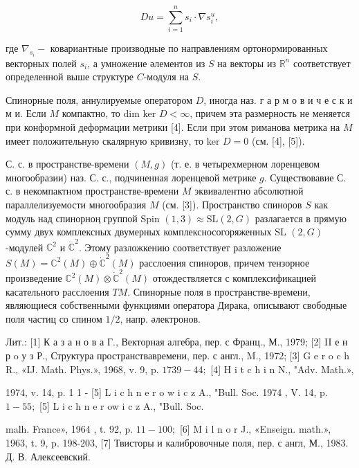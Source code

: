 \documentclass[10pt]{article}
\begin{document}
\[

D u=\sum_{i=1}^{n} s_{i} \cdot \nabla s_{i}^{u},

\]



где $\nabla_{s_{i}}-$ ковариантные производные по направлениям ортонормированных векторных полей $s_{i}$, а умножение әлементов из $S$ на векторы из $\mathbb{R}^{n}$ соответствует определенной выше структуре $C$-модуля на $S$.



Спинорные поля, аннулируемые оператором $D$, иногда наз. г а р м о в и ч е с к и м и. Если $M$ компактно, то dim ker $D<\infty$, причем эта размерность не меняется при конформной деформации метрики [4]. Если при этом риманова метрика на $M$ имеет положительную скалярную кривизну, то ker $D=0$ (см. [4], [5]).



С. с. в пространстве-времени $(M, g)$ (т. е. в четырехмерном лоренцевом многообразии) наз. С. с., подчиненная лоренцевой метрике $g$. Существовавие С. с. в некомпактном пространстве-времени $M$ эквивалентно абсолютной параллелизуемости многообразия $M$ (см. [3]). Пространство спиноров $S$ как модуль над спинорноң группой Spin $(1,3) \approx \mathrm{SL}(2, G)$ разлагается в прямую сумму двух комплексных двумерных комплексносогоряженных SL $(2, G)$-модулей $\mathbb{C}^{2}$ и $\dot{\mathbb{C}}^{2}$. Этому разложкению соответствует разложение $S(M)=\mathbb{C}^{2}(M) \oplus \dot{\mathbb{C}}^{2}(M)$ расслоения спиноров, причем тензорное произведение $\mathbb{C}^{2}(M) \otimes \dot{\mathbb{C}}^{2}(M)$ отождествляется с комплексификацией касательного расслоения $T M$. Спинорные поля в пространстве-времени, являющиеся собственными функциями оператора Дирака, описывают свободные поля частиц со спином $1 / 2$, напр. әлектронов.



Лит.: [1] К а з а н о в а Г., Векторная алгебра, пер. с Франц., М., 1979; [2] II е н р o у з Р., Структура пространствавремени, пер. с англ., M., 1972; [3] G e r o c h R., «IJ. Math. Phys.», 1968, v. 9, p. $1739-44 ;$ [4] H i t c h i n N., "Adv. Math.»,

1974, v. 14, p. 1 1 - [5] L i c h n e r o w i c z A., "Bull. Soc. 1974 , V. 14, p. $1-55 ;$ [5] L i c h n e r ow i c z A., "Bull. Soc.

malh. France», 1964 , t. 92, p. $11-100 ;$ [6] M i l n o r J., «Enseign. math.», 1963, t. 9, p. 198-203, [7] Твисторы и калибровочные поля, пер. с англ, М., 1983. Д. В. Алексеевский.
\end{document}
